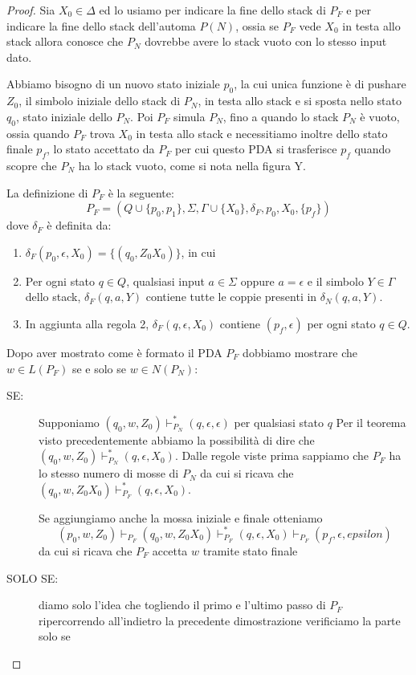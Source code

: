\documentclass[a4paper]{book}
\theoremstyle{definition}%
\begin{document}
\begin{proof}
Sia $X_0 \in \Delta$ ed lo usiamo per indicare la fine dello stack di $P_F$ e per
indicare la fine dello stack dell'automa $P(N)$, ossia se $P_F$ vede $X_0$ in testa allo stack
allora conosce che $P_N$ dovrebbe avere lo stack vuoto con lo stesso input dato.

Abbiamo bisogno di un nuovo stato iniziale $p_0$, la cui unica funzione è di pushare $Z_0$,
il simbolo iniziale dello stack di $P_N$, in testa allo stack e si sposta nello stato $q_0$, stato iniziale dello $P_N$.\newline
Poi $P_F$ simula $P_N$, fino a quando lo stack $P_N$ è vuoto, ossia quando $P_F$ trova $X_0$ in testa allo stack
e necessitiamo inoltre dello stato finale $p_f$, lo stato accettato da $P_F$ per cui
questo PDA si trasferisce $p_f$ quando scopre che $P_N$ ha lo stack vuoto, come si nota nella figura Y.

La definizione di $P_F$ è la seguente:
\[ P_F = (Q \cup \{p_0, p_1\}, \Sigma, \Gamma \cup \{X_0\}, \delta_F, p_0, X_0, \{p_f\})\]
dove $\delta_F$ è definita da:
\begin{enumerate}
  \item $\delta_F(p_0, \epsilon, X_0) = \{(q_0, Z_0X_0)\}$, in cui
  \item Per ogni stato $q \in Q$, qualsiasi input $a \in \Sigma$ oppure $a = \epsilon$ e il simbolo $Y \in \Gamma$ dello stack,
        $\delta_F(q, a, Y)$ contiene tutte le coppie presenti in $\delta_N(q, a, Y)$.
  \item In aggiunta alla regola 2, $\delta_F(q, \epsilon, X_0)$ contiene $(p_f, \epsilon)$ per ogni stato $q \in Q$.
\end{enumerate}
Dopo aver mostrato come è formato il PDA $P_F$ dobbiamo mostrare che $w \in L(P_F)$ se e solo se $w \in N(P_N)$:
\begin{description}
  \item [SE:] Supponiamo $(q_0, w, Z_0) \vdash ^* _{P_N} (q, \epsilon, \epsilon)$ per qualsiasi stato $q$
        Per il teorema visto precedentemente abbiamo la possibilità di dire che $(q_0, w, Z_0)
        \vdash ^* _{P_N} (q, \epsilon, X_0)$.\newline
        Dalle regole viste prima sappiamo che $P_F$ ha lo stesso numero di mosse di $P_N$
        da cui si ricava che $(q_0, w, Z_0X_0) \vdash ^* _{P_F} (q, \epsilon, X_0)$.

       Se aggiungiamo anche la mossa iniziale e finale otteniamo
       \[ (p_0, w, Z_0) \vdash _{P_F} (q_0, w, Z_0X_0) \vdash ^* _{P_F} (q, \epsilon, X_0) \vdash _{P_F}
          (p_f, \epsilon, epsilon) \]
      da cui si ricava che $P_F$ accetta $w$ tramite stato finale
  \item [SOLO SE:] diamo solo l'idea che togliendo il primo e l'ultimo passo di $P_F$
                   ripercorrendo all'indietro la precedente dimostrazione verificiamo la parte solo se
\end{description}
\end{proof}
\end{document}
